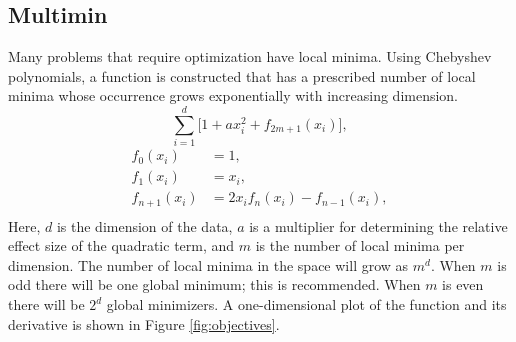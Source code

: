 \documentclass[conference]{ieeeconf}  %
\begin{document}
\subsection{Multimin}

Many problems that require optimization have local minima. Using
Chebyshev polynomials, a function is constructed that has a prescribed
number of local minima whose occurrence grows exponentially with
increasing dimension.
$$ \sum_{i=1}^{d} \big [  1 + a x_i^2 + f_{2m + 1}(x_i) \big ], $$
\begin{align*}
  f_0(x_i) &= 1, \\
  f_1(x_i) &= x_i, \\
  f_{n+1}(x_i) &= 2 x_i f_{n}(x_i) - f_{n-1}(x_i), \\
\end{align*}
Here, $d$ is the dimension of the data, $a$ is a multiplier for
determining the relative effect size of the quadratic term, and $m$ is
the number of local minima per dimension. The number of local minima
in the space will grow as $m^d$. When $m$ is odd there will be one
global minimum; this is recommended.  When $m$ is even there will be
$2^d$ global minimizers. A one-dimensional plot of the function and
its derivative is shown in Figure \ref{fig:objectives}.
\end{document}
